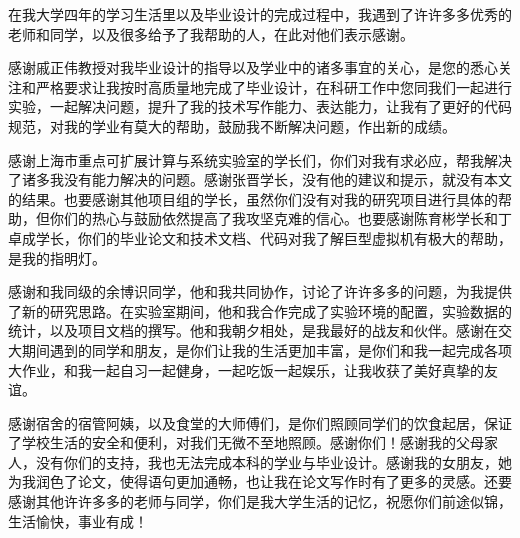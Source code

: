 \begin{thanks}
在我大学四年的学习生活里以及毕业设计的完成过程中，我遇到了许许多多优秀的老师和同学，以及很多给予了我帮助的人，在此对他们表示感谢。

感谢戚正伟教授对我毕业设计的指导以及学业中的诸多事宜的关心，是您的悉心关注和严格要求让我按时高质量地完成了毕业设计，在科研工作中您同我们一起进行实验，一起解决问题，提升了我的技术写作能力、表达能力，让我有了更好的代码规范，对我的学业有莫大的帮助，鼓励我不断解决问题，作出新的成绩。

感谢上海市重点可扩展计算与系统实验室的学长们，你们对我有求必应，帮我解决了诸多我没有能力解决的问题。感谢张晋学长，没有他的建议和提示，就没有本文的结果。也要感谢其他项目组的学长，虽然你们没有对我的研究项目进行具体的帮助，但你们的热心与鼓励依然提高了我攻坚克难的信心。也要感谢陈育彬学长和丁卓成学长，你们的毕业论文和技术文档、代码对我了解巨型虚拟机有极大的帮助，是我的指明灯。

感谢和我同级的余博识同学，他和我共同协作，讨论了许许多多的问题，为我提供了新的研究思路。在实验室期间，他和我合作完成了实验环境的配置，实验数据的统计，以及项目文档的撰写。他和我朝夕相处，是我最好的战友和伙伴。感谢在交大期间遇到的同学和朋友，是你们让我的生活更加丰富，是你们和我一起完成各项大作业，和我一起自习一起健身，一起吃饭一起娱乐，让我收获了美好真挚的友谊。

感谢宿舍的宿管阿姨，以及食堂的大师傅们，是你们照顾同学们的饮食起居，保证了学校生活的安全和便利，对我们无微不至地照顾。感谢你们！感谢我的父母家人，没有你们的支持，我也无法完成本科的学业与毕业设计。感谢我的女朋友，她为我润色了论文，使得语句更加通畅，也让我在论文写作时有了更多的灵感。还要感谢其他许许多多的老师与同学，你们是我大学生活的记忆，祝愿你们前途似锦，生活愉快，事业有成！

  

\end{thanks}
